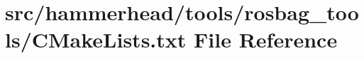 \hypertarget{tools_2rosbag__tools_2CMakeLists_8txt}{}\section{src/hammerhead/tools/rosbag\+\_\+tools/\+C\+Make\+Lists.txt File Reference}
\label{tools_2rosbag__tools_2CMakeLists_8txt}
